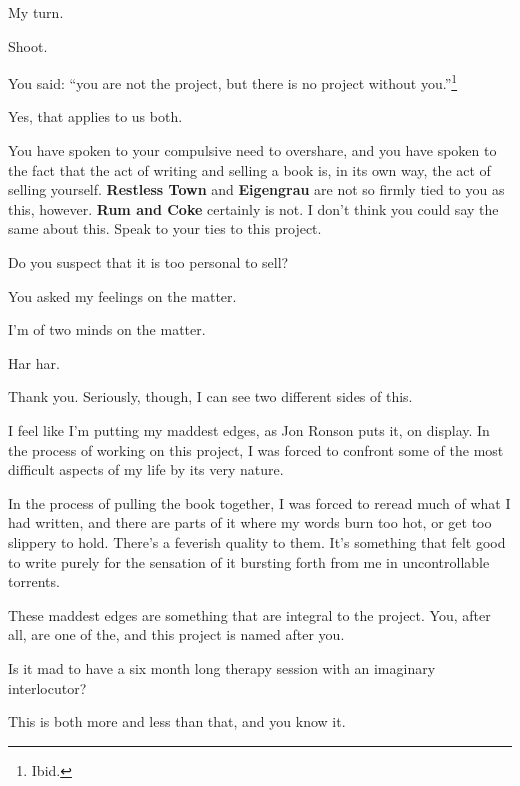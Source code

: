 \label{ally:32}
\begin{paracol}{2}
  \begin{leftcolumn}
\begin{ally}
My turn.
\end{ally}
Shoot.

\begin{ally}
You said: ``you are not the project, but there is no project without you.''\footnote{Ibid.}
\end{ally}
Yes, that applies to us both.

\begin{ally}
You have spoken to your compulsive need to overshare, and you have spoken to the fact that the act of writing and selling a book is, in its own way, the act of selling yourself. \textbf{Restless Town} and \textbf{Eigengrau} are not so firmly tied to you as this, however. \textbf{Rum and Coke} certainly is not. I don't think you could say the same about this. Speak to your ties to this project.
\end{ally}
Do you suspect that it is too personal to sell?

\begin{ally}
You asked my feelings on the matter.
\end{ally}
I'm of two minds on the matter.

\begin{ally}
Har har.
\end{ally}
Thank you. Seriously, though, I can see two different sides of this.

I feel like I'm putting my maddest edges, as Jon Ronson puts it, on display. In the process of working on this project, I was forced to confront some of the most difficult aspects of my life by its very nature.

In the process of pulling the book together, I was forced to reread much of what I had written, and there are parts of it where my words burn too hot, or get too slippery to hold. There's a feverish quality to them. It's something that felt good to write purely for the sensation of it bursting forth from me in uncontrollable torrents.

These maddest edges are something that are integral to the project. You, after all, are one of the, and this project is named after you.

\begin{ally}
Is it mad to have a six month long therapy session with an imaginary interlocutor?
\end{ally}
This is both more and less than that, and you know it.


\end{leftcolumn}
\end{paracol}
